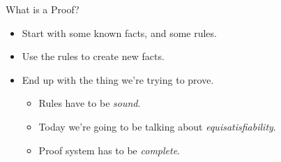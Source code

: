 \documentclass[aspectratio=169,compress,10pt]{beamer}
\begin{document}
\begin{frame}{What is a Proof?}
    \begin{itemize}
        \item Start with some known facts, and some rules.
        \item Use the rules to create new facts.
        \item End up with the thing we're trying to prove.
            \begin{itemize}
                \item Rules have to be \emph{sound}.
                \item Today we're going to be talking about \emph{equisatisfiability}.
                \item Proof system has to be \emph{complete}.
            \end{itemize}
    \end{itemize}
\end{frame}
\end{document}
